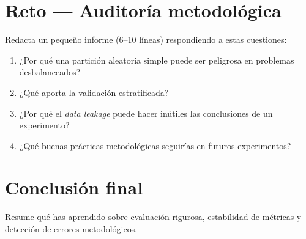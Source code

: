 \vspace{1.4cm}

\section{Reto — Auditoría metodológica}
Redacta un pequeño informe (6--10 líneas) respondiendo a estas cuestiones:
\begin{enumerate}
    \item ¿Por qué una partición aleatoria simple puede ser peligrosa en problemas desbalanceados?
    \item ¿Qué aporta la validación estratificada?
    \item ¿Por qué el \textit{data leakage} puede hacer inútiles las conclusiones de un experimento?
    \item ¿Qué buenas prácticas metodológicas seguirías en futuros experimentos?
\end{enumerate}

\vspace{2cm}

\section{Conclusión final}
Resume qué has aprendido sobre evaluación rigurosa, estabilidad de métricas y detección de errores metodológicos.
